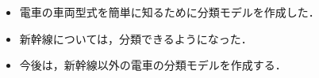 \newpage


\label{MUSUBI}
\begin{itemize}
	\item 電車の車両型式を簡単に知るために分類モデルを作成した．
	\item 新幹線については，分類できるようになった．
	\item 今後は，新幹線以外の電車の分類モデルを作成する．
\end{itemize}
\newpage






%
%





